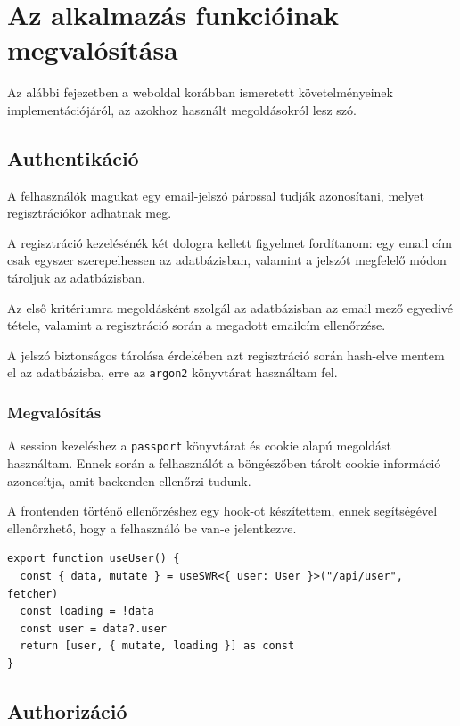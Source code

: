 \chapter{Az alkalmazás funkcióinak megvalósítása}

Az alábbi fejezetben a weboldal korábban ismeretett követelményeinek implementációjáról, az azokhoz használt
megoldásokról lesz szó.

\section{Authentikáció}

A felhasználók magukat egy email-jelszó párossal tudják azonosítani, melyet regisztrációkor adhatnak meg.

A regisztráció kezelésénék két dologra kellett figyelmet fordítanom: egy email cím csak egyszer szerepelhessen
az adatbázisban, valamint a jelszót megfelelő módon tároljuk az adatbázisban.

Az első kritériumra megoldásként szolgál az adatbázisban az email mező egyedivé tétele, valamint a regisztráció során
a megadott emailcím ellenőrzése.

A jelszó biztonságos tárolása érdekében azt regisztráció során hash-elve mentem el az adatbázisba, erre az \lstinline|argon2| könyvtárat
használtam fel.

\subsection{Megvalósítás}

A session kezeléshez a \lstinline|passport| könyvtárat és cookie alapú megoldást használtam. Ennek során a felhasználót a böngészőben
tárolt cookie információ azonosítja, amit backenden ellenőrzi tudunk.

A frontenden történő ellenőrzéshez egy hook-ot készítettem, ennek segítségével ellenőrzhető, hogy a felhasználó be van-e jelentkezve.

\begin{lstlisting}[caption=Authentikáció hook]
export function useUser() {
  const { data, mutate } = useSWR<{ user: User }>("/api/user", fetcher)
  const loading = !data
  const user = data?.user
  return [user, { mutate, loading }] as const
}
\end{lstlisting}

\section{Authorizáció}

